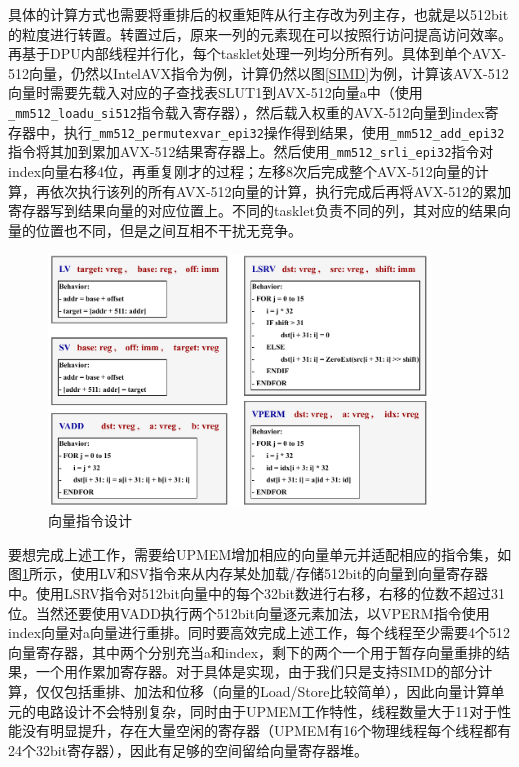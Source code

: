 具体的计算方式也需要将重排后的权重矩阵从行主存改为列主存，也就是以512bit的粒度进行转置。转置过后，原来一列的元素现在可以按照行访问提高访问效率。再基于DPU内部线程并行化，每个tasklet处理一列均分所有列。具体到单个AVX-512向量，仍然以IntelAVX指令为例，计算仍然以图\ref{SIMD}为例，计算该AVX-512向量时需要先载入对应的子查找表SLUT1到AVX-512向量a中（使用\verb|_mm512_loadu_si512|指令载入寄存器），然后载入权重的AVX-512向量到index寄存器中，执行\verb|_mm512_permutexvar_epi32|操作得到结果，使用\verb|_mm512_add_epi32|指令将其加到累加AVX-512结果寄存器上。然后使用\verb|_mm512_srli_epi32|指令对index向量右移4位，再重复刚才的过程；左移8次后完成整个AVX-512向量的计算，再依次执行该列的所有AVX-512向量的计算，执行完成后再将AVX-512的累加寄存器写到结果向量的对应位置上。不同的tasklet负责不同的列，其对应的结果向量的位置也不同，但是之间互相不干扰无竞争。

\begin{figure}[!htbp]
	\centering
    \includegraphics[width=0.9\textwidth]{figures/SIMDInst.pdf}
	\caption{向量指令设计}
    \label{SIMDInst}
\end{figure}

要想完成上述工作，需要给UPMEM增加相应的向量单元并适配相应的指令集，如图\ref{SIMDInst}所示，使用LV和SV指令来从内存某处加载/存储512bit的向量到向量寄存器中。使用LSRV指令对512bit向量中的每个32bit数进行右移，右移的位数不超过31位。当然还要使用VADD执行两个512bit向量逐元素加法，以VPERM指令使用index向量对a向量进行重排。同时要高效完成上述工作，每个线程至少需要4个512向量寄存器，其中两个分别充当a和index，剩下的两个一个用于暂存向量重排的结果，一个用作累加寄存器。对于具体是实现，由于我们只是支持SIMD的部分计算，仅仅包括重排、加法和位移（向量的Load/Store比较简单），因此向量计算单元的电路设计不会特别复杂，同时由于UPMEM工作特性，线程数量大于11对于性能没有明显提升，存在大量空闲的寄存器（UPMEM有16个物理线程每个线程都有24个32bit寄存器），因此有足够的空间留给向量寄存器堆。

